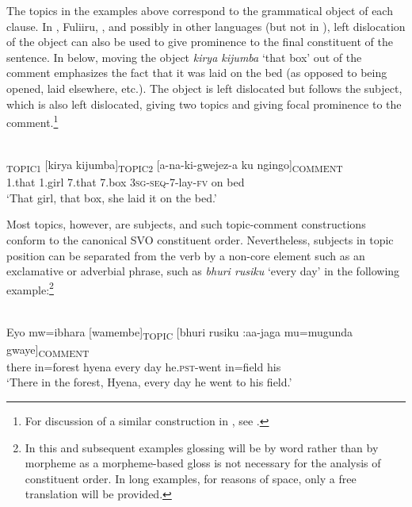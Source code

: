 \documentclass[output=paper]{langsci/langscibook}
\begin{document}
The topics in the examples above correspond to the grammatical object of each clause. In , Fuliiru, , and possibly in other languages (but not in ), left dislocation of the object can also be used to give prominence to the final constituent of the sentence. In  below, moving the object \textit{kirya kijumba} ‘that box’ out of the comment emphasizes the fact that it was laid on the bed (as opposed to being opened, laid elsewhere, etc.). The object is left dislocated but follows the subject, which is also left dislocated, giving two topics and giving focal prominence to the comment.\footnote{For discussion of a similar construction in , see \citet[756--758]{yoneda2011}.}

\ea\label{ex:4.nicolle}
\\
\textsubscript{TOPIC1} [kirya kijumba]\textsubscript{TOPIC2} [a-na-ki-gwejez-a ku ngingo]\textsubscript{COMMENT}\\
{\db}1.that 1.girl {\db}7.that 7.box {\db}\textsc{3sg-seq}-7-lay-\textsc{fv} on bed\\
\glt ‘That girl, that box, she laid it on the bed.’
\z

Most topics, however, are subjects, and such topic-comment constructions conform to the canonical SVO constituent order. Nevertheless, subjects in topic position can be separated from the verb by a non-core element such as an exclamative or adverbial phrase, such as \textit{bhuri rusiku} ‘every day’ in the following example:\footnote{In this and subsequent examples glossing will be by word rather than by morpheme as a morpheme-based gloss is not necessary for the analysis of constituent order. In long examples, for reasons of space, only a free translation will be provided.}


\ea\label{ex:5.nicolle}
\\
\gll Eyo mw=ibhara [wamembe]\textsubscript{TOPIC} [bhuri rusiku :aa-jaga{\rmfnm} mu=mugunda gwaye]\textsubscript{COMMENT}\\
there in=forest {\db}hyena {\db}every  day he.\textsc{pst}-went in=field his \\ 
\glt ‘There in the forest, Hyena, every day he went to his field.’
\z

\end{document}
